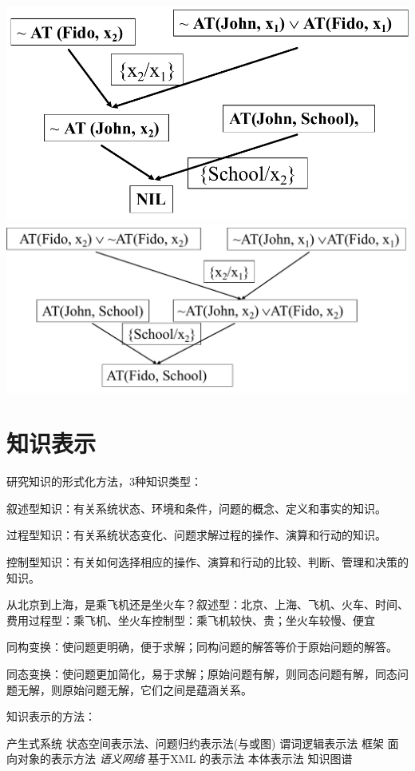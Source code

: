 \documentclass[twocolumn,zihao=5,linespread=1,heading=false,autoindent=0pt]{ctexart}
\theoremstyle{exampstyle} \newtheorem{definition}{定义}[section]
\theoremstyle{exampstyle} \newtheorem{example}{例}[section]
\theoremstyle{exampstyle} \newtheorem{theorem}{定理}[section]
\theoremstyle{exampstyle} \newtheorem{lemma}{引理}[section]
\theoremstyle{exampstyle} \newtheorem{myproof}{证明}[section]
\begin{document}
\includegraphics[width=0.5\linewidth]{stage1.pdf}
\includegraphics[width=0.5\linewidth]{stage2.pdf}


\vspace{-\baselineskip}

\section{知识表示}
研究知识的形式化方法，3种知识类型：

叙述型知识：有关系统状态、环境和条件，问题的概念、定义和事实的知识。

过程型知识：有关系统状态变化、问题求解过程的操作、演算和行动的知识。

控制型知识：有关如何选择相应的操作、演算和行动的比较、判断、管理和决策的知识。

从北京到上海，是乘飞机还是坐火车？叙述型：北京、上海、飞机、火车、时间、费用过程型：乘飞机、坐火车控制型：乘飞机较快、贵；坐火车较慢、便宜

同构变换：使问题更明确，便于求解；同构问题的解答等价于原始问题的解答。

同态变换：使问题更加简化，易于求解；原始问题有解，则同态问题有解，同态问题无解，则原始问题无解，它们之间是蕴涵关系。

\begin{multicols}{2}
    知识表示的方法：
\begin{outline}[citemize]
    \1 产生式系统
    \1 状态空间表示法、问题归约表示法(与或图)
    \1 谓词逻辑表示法
    \1 框架
    \1 面向对象的表示方法
    \1 \emph{语义网络}
    \1 基于XML 的表示法
    \1 本体表示法
    \1 知识图谱    
\end{outline}
\end{multicols}
\end{document}
